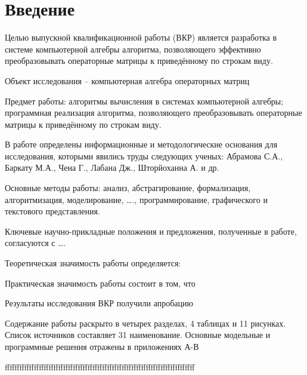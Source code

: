 \newpage
\section{Введение}
Целью выпускной квалификационной работы (ВКР) является разработка в системе компьютерной алгебры алгоритма, позволяющего эффективно преобразовывать операторные матрицы к приведённому по строкам виду.


Объект исследования – компьютерная алгебра операторных матриц


Предмет работы: алгоритмы вычисления в системах компьютерной алгебры; программная реализация алгоритма, позволяющего преобразовывать операторные матрицы к приведённому по строкам виду.


В работе определены информационные и методологические основания для исследования, которыми явились труды следующих ученых: Абрамова С.А., Баркату М.А., Чена Г., Лабана Дж., Шторйоханна А. и др.


Основные методы работы: анализ, абстрагирование, формализация, алгоритмизация, моделирование, …., программирование, графического и текстового представления.


Ключевые научно-прикладные положения и предложения, полученные в работе, согласуются с ….


Теоретическая значимость работы определяется: 


Практическая значимость работы состоит в том, что 


Результаты исследования ВКР получили апробацию 


Содержание работы раскрыто в четырех разделах, 4 таблицах и 11 рисунках. Список источников составляет 31 наименование. Основные модельные и программные решения отражены в приложениях А-В 

ffffffffffffffffffffffffffffffffffffffffffffffffffffffffffffffffffffffffffffff

